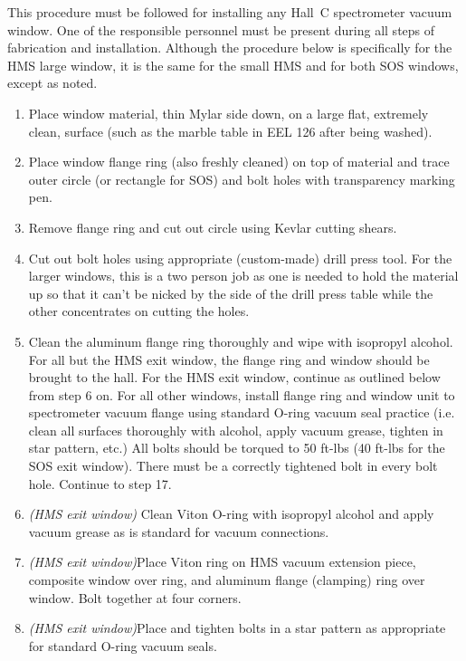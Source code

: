 This procedure must be followed for installing any Hall~C spectrometer
vacuum window. One of the responsible personnel must be present during
all steps of fabrication and installation.
Although the procedure below is specifically for
the HMS large window, it is the same for the small HMS and for both SOS windows,
except as noted.
\begin{enumerate}
\item{Place window material, thin Mylar side down,
on a large flat, extremely clean, surface (such as
the marble table in EEL 126 after being washed).}

\item{Place window flange ring (also freshly cleaned) on top of material
and trace outer
circle (or rectangle for SOS) and bolt holes with transparency marking
pen.}

\item{Remove flange ring and cut out circle using Kevlar cutting 
shears.}

\item{Cut out bolt holes using appropriate (custom-made) drill press tool.
For the larger windows, this is a two person job as one is needed to hold the
material up so that it can't be nicked by the side of the drill press table
while the other concentrates on cutting the holes.}

\item{Clean the aluminum flange ring thoroughly and wipe with isopropyl
alcohol. For all but the HMS exit window, the flange ring and
window should be brought to the hall.  For the HMS exit window,
continue as outlined below from step 6 on.  For all other windows,
install flange ring and window unit to spectrometer vacuum flange
using standard O-ring vacuum seal practice (i.e. clean all surfaces
thoroughly with alcohol, apply vacuum grease, tighten in star pattern,
etc.)  All bolts should be torqued to 50 ft-lbs (40 ft-lbs for the
SOS exit window).  There must be a correctly tightened bolt in every
bolt hole.  Continue to step 17.}

\item{{\sl (HMS exit window)} Clean Viton O-ring with isopropyl alcohol and apply vacuum
grease as is standard for vacuum connections.}

\item{{\sl (HMS exit window)}Place Viton ring on HMS vacuum extension piece, composite
window over ring, and aluminum flange (clamping) ring over window.   Bolt together at four corners.}

\item{{\sl (HMS exit window)}Place and tighten bolts in a star pattern as appropriate for
standard O-ring vacuum seals.}


\end{enumerate}
